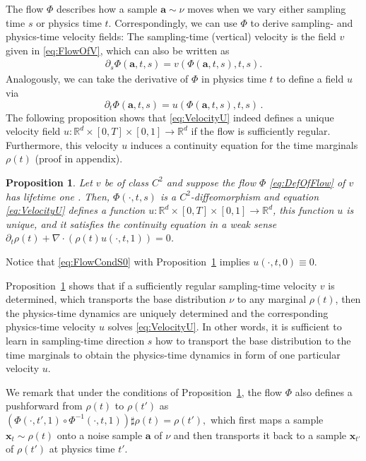 \documentclass{article}
\newcommand{\bfx}{\boldsymbol{x}}
\newcommand{\bfa}{\boldsymbol{a}}
\theoremstyle{definition}
\theoremstyle{plain}
\newtheorem{proposition}[theorem]{Proposition}
\theoremstyle{definition}
\theoremstyle{remark}
\newcommand{\Flow}{\Phi}
\begin{document}
The flow $\Phi$ describes how a sample $\bfa \sim \nu$ moves when we vary either sampling time $s$ or physics time $t$. Correspondingly, we can use $\Phi$ to derive sampling- and physics-time velocity fields: The sampling-time (vertical) velocity is the field $v$ given in \eqref{eq:FlowOfV},  which can also be written as 
\begin{align}\label{eq:DefVViaPhi}
    \partial_s \Flow(\bfa, t, s) = v(\Flow(\bfa, t, s), t, s).
\end{align}
Analogously, we can take the derivative of $\Phi$ in physics time $t$ to define a field $u$ via 
\begin{equation}\label{eq:VelocityU}
        \partial_t \Flow(\bfa, t, s) = u(\Flow(\bfa, t, s), t, s)\,.
\end{equation}
The following proposition shows that \eqref{eq:VelocityU} indeed defines a unique velocity field $u: \mathbb{R}^d \times [0, T] \times [0, 1] \to \mathbb{R}^d$ if the flow is sufficiently regular. Furthermore, this velocity $u$ induces a continuity equation for the time marginals $\rho(t)$ (proof in appendix). 
\begin{proposition}
\label{prop:uniqueness}
Let $v$ be of class $C^2$ 
and suppose the flow $\Flow$ \eqref{eq:DefOfFlow} of $v$ has lifetime one \citep[Definition~4.1.15]{abraham_manifolds_1988}. Then, $\Phi(\cdot, t, s)$ is a $C^2$-diffeomorphism and equation \eqref{eq:VelocityU} defines a function $u: \mathbb{R}^d \times [0, T] \times [0, 1] \to \mathbb{R}^d$, this function $u$ is unique, and it satisfies the continuity equation in a weak sense $\partial_t \rho(t) + \nabla \cdot (\rho(t) u(\cdot, t, 1)) = 0$.
\end{proposition}
Notice that \eqref{eq:FlowCondS0} with Proposition~\ref{prop:uniqueness} implies $u(\cdot, t, 0) \equiv 0$. 


Proposition~\ref{prop:uniqueness} shows that if a sufficiently regular sampling-time velocity $v$ is determined, which transports the base distribution $\nu$ to any marginal $\rho(t)$, then the physics-time dynamics are uniquely determined and the corresponding physics-time velocity $u$ solves  \eqref{eq:VelocityU}. In other words, it is sufficient to learn in sampling-time direction $s$ how to transport the base distribution to the time marginals to obtain the physics-time dynamics in form of one particular velocity $u$. 

We remark that under the conditions of Proposition~\ref{prop:uniqueness}, the flow $\Phi$ also defines a pushforward from $\rho(t)$ to $\rho(t')$ as $\left( \Flow(\cdot, t', 1) \circ \Flow^{-1}(\cdot , t, 1) \right) \sharp \rho(t) = \rho({t'}),$ which first maps a sample $\bfx_t \sim \rho(t)$ onto a noise sample $\bfa$ of $\nu$ and then transports it back to a sample $\bfx_{t'}$ of $\rho({t'})$ at physics time $t'$. 
\end{document}
